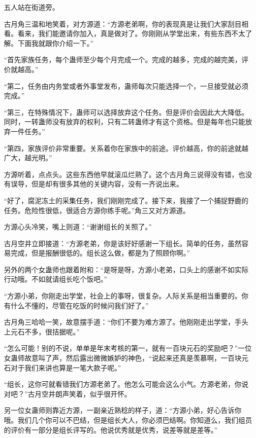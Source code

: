 
\begin{this_body}



五人站在街道旁。

古月角三温和地笑着，对方源道：“方源老弟啊，你的表现真是让我们大家刮目相看。看来，我们能邀请你加入，真是做对了。你刚刚从学堂出来，有些东西不太了解。下面我就跟你介绍一下。”

“首先家族任务，每个蛊师至少每个月完成一个。完成的越多，完成的越完美，评价就越高。”

“第二，任务由内务堂或者外事堂发布，蛊师每次只能选择一个，一旦接受就必须完成。”

“第三，在特殊情况下，蛊师可以选择放弃这个任务。但是评价会因此大大降低。同时，一转蛊师没有放弃的权利，只有二转蛊师才有这个资格。但是每年也只能放弃一件任务。”

“第四，家族评价非常重要。关系着你在家族中的前途。评价越高，你的前途就越广大，越光明。”

方源听着，点点头。这些东西他早就滚瓜烂熟了。这个古月角三说得没有错，也没有误导，但是却有很多其他的关键内容，没有一齐说出来。

“好了，腐泥冻土的采集任务，我们刚刚完成了。接下来，我接了一个捕捉野鹿的任务。危险性很低，很适合方源你练手呢。”角三又对方源道。

方源心头冷笑，嘴上则道：“谢谢组长的关照了。”

古月空井立即接道：“方源老弟，你是该好好感谢一下组长。简单的任务，虽然容易完成，但是报酬很低的。组长这么做，都是为了照顾你啊。”

另外的两个女蛊师也跟着附和：“是呀是呀，方源小老弟，口头上的感谢不如实际行动哦。不如就请组长吃个饭吧。”

“方源小弟，你刚走出学堂，社会上的事呀，很复杂。人际关系是相当重要的。你有什么不懂的，尽管在吃饭的时候问我们好了。”

古月角三哈哈一笑，故意摆手道：“你们不要为难方源了。他刚刚走出学堂，手头上元石不多，很拮据呢。”

“怎么可能！别的不说，单单是年末考核的第一，就有一百块元石的奖励吧？”一位女蛊师故意叫了声，然后露出微微嫉妒的神色，“说起来还真是羡慕啊，一百块元石对于我们来讲也算是一笔大款子呢。”

“组长，这你可就看错我们方源老弟了。他怎么可能会这么小气。方源老弟，你说对吧？”古月空井朗声笑着，似乎很开怀。

另一位女蛊师则靠近方源，一副亲近熟稔的样子，道：“方源小弟，好心告诉你哦。我们几个你可以不巴结，但是组长大人，你必须巴结啊。你知道么，我们组员的评价有一部分是组长评写的。他说优秀就是优秀，说差等就是差等。”


\end{this_body}
